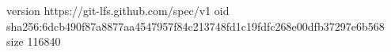 version https://git-lfs.github.com/spec/v1
oid sha256:6dcb490f87a8877aa4547957f84c213748fd1c19fdfc268e00dfb37297e6b568
size 116840
